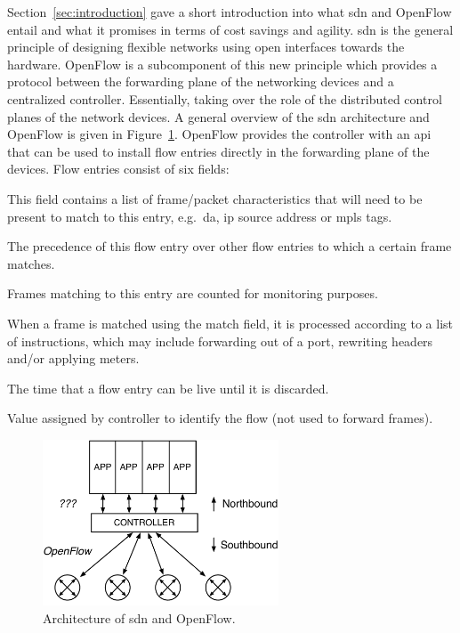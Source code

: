 Section~\ref{sec:introduction} gave a short introduction into what \ac{sdn} and OpenFlow entail and what it promises in terms of cost savings and agility. \acl{sdn} is the general principle of designing flexible networks using open interfaces towards the hardware. OpenFlow is a subcomponent of this new principle which provides a protocol between the forwarding plane of the networking devices and a centralized controller. Essentially, taking over the role of the distributed control planes of the network devices. A general overview of the \ac{sdn} architecture and OpenFlow is given in Figure~\ref{fig:of-arch}. OpenFlow provides the controller with an \ac{api} that can be used to install flow entries directly in the forwarding plane of the devices. Flow entries consist of six fields:

\begin{description}[leftmargin=!,labelwidth=\widthof{\bfseries Instructions}]
	\item[Match] This field contains a list of frame/packet characteristics that will need to be present to match to this entry, e.g.\ \ac{da}, \ac{ip} source address or \ac{mpls} tags.
	\item[Priority] The precedence of this flow entry over other flow entries to which a certain frame matches.
	\item[Counters] Frames matching to this entry are counted for monitoring purposes.
	\item[Instructions] When a frame is matched using the match field, it is processed according to a list of instructions, which may include forwarding out of a port, rewriting headers and/or applying meters.
	\item[Timeouts] The time that a flow entry can be live until it is discarded.
	\item[Cookie] Value assigned by controller to identify the flow (not used to forward frames).
\end{description}

\begin{figure}[!h]
	\centering
	\includegraphics[width=7cm]{./includes/of-arch.pdf}
	\caption{Architecture of \ac{sdn} and OpenFlow.}
	\label{fig:of-arch}
\end{figure}

